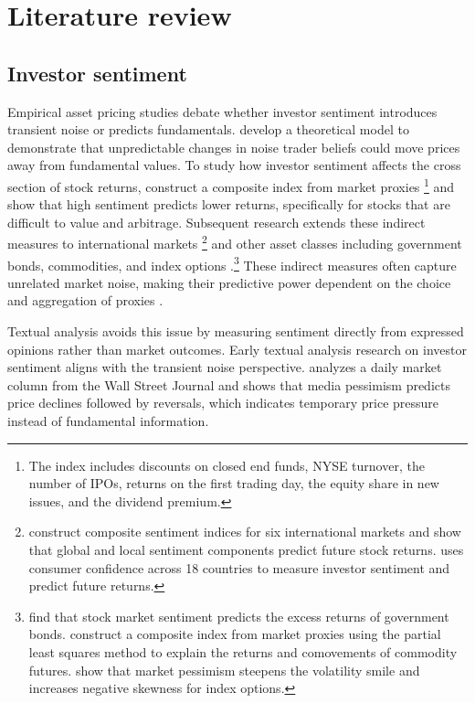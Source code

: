\documentclass[12pt]{article}
\begin{document}
\section{Literature review}\label{sec:literature_review}

\subsection{Investor sentiment}


Empirical asset pricing studies debate whether investor sentiment introduces transient noise or predicts fundamentals. \citet{delong1990noise} develop a theoretical model to demonstrate that unpredictable changes in noise trader beliefs could move prices away from fundamental values. To study how investor sentiment affects the cross section of stock returns, \citet{baker2006} construct a composite index from market proxies \footnote{The index includes discounts on closed end funds, NYSE turnover, the number of IPOs, returns on the first trading day, the equity share in new issues, and the dividend premium.} and show that high sentiment predicts lower returns, specifically for stocks that are difficult to value and arbitrage. Subsequent research extends these indirect measures to international markets \citep{baker2012global,schmeling2009} \footnote{\citet{baker2012global} construct composite sentiment indices for six international markets and show that global and local sentiment components predict future stock returns. \citet{schmeling2009} uses consumer confidence across 18 countries to measure investor sentiment and predict future returns.} and other asset classes including government bonds, commodities, and index options \citep{baker2012bonds,gao2015,han2008}.\footnote{\citet{baker2012bonds} find that stock market sentiment predicts the excess returns of government bonds. \citet{gao2015} construct a composite index from market proxies using the partial least squares method to explain the returns and comovements of commodity futures. \citet{han2008} show that market pessimism steepens the volatility smile and increases negative skewness for index options.} These indirect measures often capture unrelated market noise, making their predictive power dependent on the choice and aggregation of proxies \citep{huang2015}.

Textual analysis avoids this issue by measuring sentiment directly from expressed opinions rather than market outcomes. Early textual analysis research on investor sentiment aligns with the transient noise perspective. \citet{tetlock2007giving} analyzes a daily market column from the Wall Street Journal and shows that media pessimism predicts price declines followed by reversals, which indicates temporary price pressure instead of fundamental information.
\end{document}
